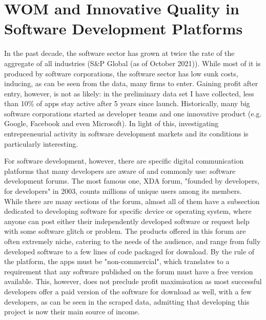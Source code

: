 \documentclass[13pt]{article}
\numberwithin{figure}{section}
\numberwithin{table}{section}
\theoremstyle{indented}
\numberwithin{equation}{section} %
\begin{document}


\setcounter{tocdepth}{2}
\addtocounter{page}{-1}


\section{WOM and Innovative Quality in Software Development Platforms}

In the past decade, the software sector has grown at twice the rate of the aggregate of all industries (S\&P Global (as of October 2021)). While most of it is produced by software corporations, the software sector has low sunk costs, inducing, as can be seen from the data, many firms to enter. Gaining profit after entry, however, is not as likely: in the preliminary data set I have collected, less than 10\% of apps stay active after 5 years since launch.  Historically, many big software corporations started as developer teams and one innovative product (e.g. Google, Facebook and even Microsoft). In light of this, investigating entrepreneurial activity in software development markets and its conditions is particularly interesting.

For software development, however, there are specific digital communication platforms that many developers are aware of and commonly use: software development forums. The most famous one, XDA forum, "founded by developers, for developers" in 2003, counts millions of unique users among its members. While there are many sections of the forum, almost all of them have a subsection dedicated to developing software for specific device or operating system, where anyone can post either their independently developed software or request help with some software glitch or problem. The products offered in this forum are often extremely niche, catering to the needs of the audience, and range from fully developed software to a few lines of code packaged for download. By the rule of the platform, the apps must be "non-commercial", which translates to a requirement that any software published on the forum must have a free version available. This, however, does not preclude profit maximisation as most successful developers offer a paid version of the software for download as well, with a few developers, as can be seen in the scraped data, admitting that developing this project is now their main source of income.
\end{document}
